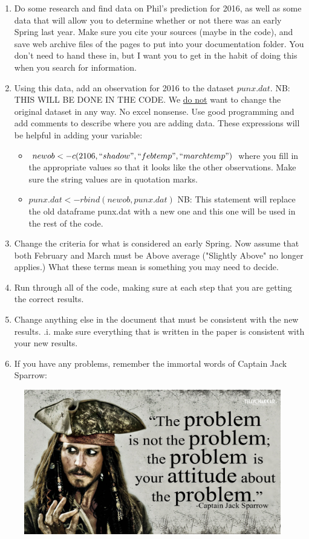 \documentclass[11pt]{article}
\begin{document}
\begin{enumerate}

\item Do some research and find data on Phil's prediction for 2016, as well as some data that will allow you to determine whether or not there was an early Spring last year. Make sure you cite your sources (maybe in the code), and save web archive files of the pages to put into your documentation folder. You don't need to hand these in, but I want you to get in the habit of doing this when you search for information. 

\item Using this data, add an observation for 2016 to the dataset $punx.dat$. NB: THIS WILL BE DONE IN THE CODE. We \underline{do not} want to change the original dataset in any way. No excel nonsense. Use good programming and add comments to describe where you are adding data. These expressions will be helpful in adding your variable: 
\begin{itemize}
\item $newob <- c(2106, ``shadow", ``febtemp", ``marchtemp")$ where you fill in the appropriate values so that it looks like the other observations. Make sure the string values are in quotation marks. 
\item $punx.dat <- rbind(newob, punx.dat)$ NB: This statement will replace the old dataframe punx.dat with a new one and this one will be used in the rest of the code. 
\end{itemize}

\item Change the criteria for what is considered an early Spring. Now assume that both February and March must be Above average ("Slightly Above" no longer applies.) What these terms mean is something you may need to decide.

\item Run through all of the code, making sure at each step that you are getting the correct results. 

\item Change anything else in the document that must be consistent with the new results. .i. make sure everything that is written in the paper is consistent with your new results. 

\item If you have any problems, remember the immortal words of Captain Jack Sparrow:


\end{enumerate}


  \begin{figure}[h]
\begin{center}
\includegraphics[scale=.15]{Jack-Sparrow-Quotes-7.jpg}
\end{center}
\end{figure}
\end{document}

